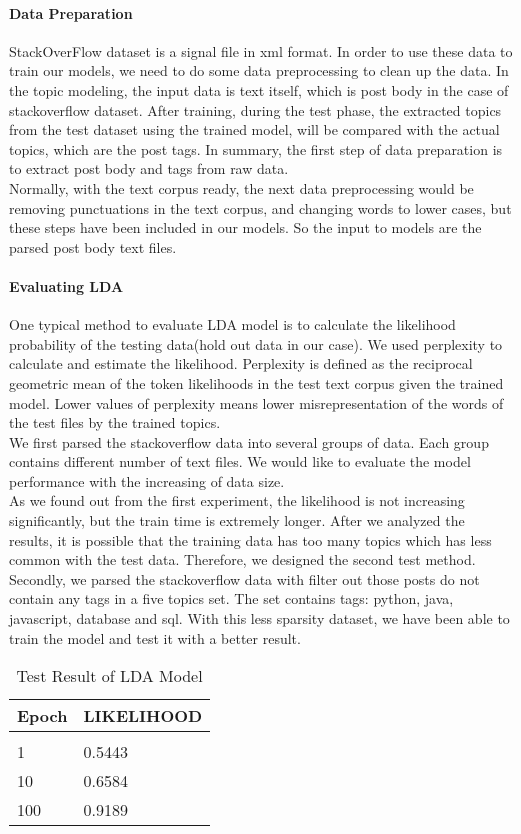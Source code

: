\paragraph{Data Preparation} 
StackOverFlow dataset is a signal file in xml format. In order to use these data to train our models, we need to do some data preprocessing to clean up the data. In the topic modeling, the input data is text itself, which is post body in the case of stackoverflow dataset. After training, during the test phase, the extracted topics from the test dataset using the trained model, will be compared with the actual topics, which are the post tags. In summary, the first step of data preparation is to extract post body and tags from raw data.\\
Normally, with the text corpus ready, the next data preprocessing would be removing punctuations in the text corpus, and changing words to lower cases, but these steps have been included in our models. So the input to models are the parsed post body text files.
\paragraph{Evaluating LDA}
One typical method to evaluate LDA model is to calculate the likelihood probability of the testing data(hold out data in our case). We used perplexity to calculate and estimate the likelihood. Perplexity is defined as the reciprocal geometric mean of the token likelihoods in the test text corpus given the trained model. Lower values of perplexity means lower misrepresentation of the words of the test files by the trained topics.\\ 
We first parsed the stackoverflow data into several groups of data. Each group contains different number of text files. We would like to evaluate the model performance with the increasing of  data size.\\
As we found out from the first experiment, the likelihood is not increasing significantly, but the train time is extremely longer. After we analyzed the results, it is possible that the training data has too many topics which has less common with the test data. Therefore, we designed the second test method.\\
Secondly, we parsed the stackoverflow data with filter out those posts do not contain any tags in a five topics set. The set contains tags: python, java, javascript, database and sql. With this less sparsity dataset, we have been able to train the model and test it with a better result.\\
\begin{table}[!htbp]
\caption{Test Result of LDA Model}
\label{lda-result}
\begin{center}
\begin{tabular}{  l  p{5cm} }
\bf Epoch & \bf LIKELIHOOD\\ \hline \\
1         &0.5443\\
10       &0.6584\\
100     &0.9189\\
\end{tabular}
\end{center}
\end{table}
